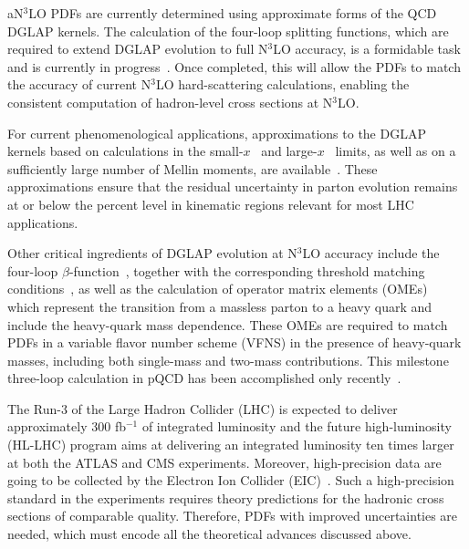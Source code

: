 \documentclass[12pt,notitlepage,aps,preprintnumbers,superscriptaddress,nofootinbib,aps,prd,floatfix]{revtex4-2}
\begin{document}
aN$^3$LO PDFs are currently determined using approximate forms of the QCD DGLAP kernels. 
The calculation of the four-loop splitting functions, which are required to extend DGLAP evolution to full N$^3$LO accuracy, is a formidable task and is currently in progress~\cite{Gracey:1994nn,Davies:2016jie,Moch:2017uml,Gehrmann:2023cqm,Falcioni:2023tzp,Gehrmann:2023iah,Kniehl:2025ttz}. Once completed, this will allow the PDFs to match the accuracy of current N$^3$LO hard-scattering calculations, enabling the consistent computation of hadron-level cross sections at N$^3$LO. 

For current phenomenological applications, approximations to the DGLAP kernels based on calculations in the small-$x$~\cite{Bonvini:2018xvt} and large-$x$~\cite{Davies:2022ofz} limits, as well as on a sufficiently large number of Mellin moments, are available~\cite{Moch:2021qrk,Falcioni:2023luc,Falcioni:2023vqq,Moch:2023tdj,Falcioni:2024xyt,Falcioni:2024qpd}. These approximations ensure that the residual uncertainty in parton evolution remains at or below the percent level in kinematic regions relevant for most LHC applications.


Other critical ingredients of DGLAP evolution at N$^3$LO accuracy include the four-loop 
$\beta$-function~\cite{vanRitbergen:1997va,Czakon:2004bu}, together with the corresponding threshold matching conditions~\cite{Chetyrkin:1997sg}, as well as the calculation of operator matrix elements (OMEs)~\cite{Witten:1975bh,Buza:1995ie,Buza:1996wv} which represent the transition from a massless
parton to a heavy quark and include the heavy-quark mass dependence. These OMEs are required to match PDFs in a variable flavor number scheme (VFNS) in the presence of heavy-quark masses, including both single-mass and two-mass contributions. This milestone three-loop calculation in pQCD has been accomplished only recently~\cite{Ablinger:2025nnq,Ablinger:2025joi,Ablinger:2024qxg,Ablinger:2024xtt,Ablinger:2023ahe,Bierenbaum:2022biv,Ablinger:2022wbb,Behring:2021asx,Ablinger:2020snj,Ablinger:2019etw,Ablinger:2018brx,Ablinger:2017xml,Ablinger:2017err,Ablinger:2014tla,Ablinger:2014uka,Behring:2014eya,transitionAqg,Ablinger:2012qm,Blumlein:2012vq,Blumlein:2011mi,Ablinger:2010ty,Bierenbaum:2009zt,Bierenbaum:2008yu,Bierenbaum:2007qe,Bierenbaum:2007dm}.

The Run-3 of the Large Hadron Collider (LHC) is expected to deliver approximately 300 fb$^{-1}$ of integrated luminosity
and the future high-luminosity (HL-LHC) program aims at delivering an integrated luminosity ten times larger at both the ATLAS and CMS experiments. 
Moreover, high-precision data are going to be collected by the Electron Ion Collider (EIC)~\cite{AbdulKhalek:2021gbh}.
Such a high-precision standard in the experiments requires theory predictions for the hadronic cross sections of comparable quality. Therefore, PDFs with improved uncertainties are needed, which must encode all the theoretical advances discussed above.
\end{document}

